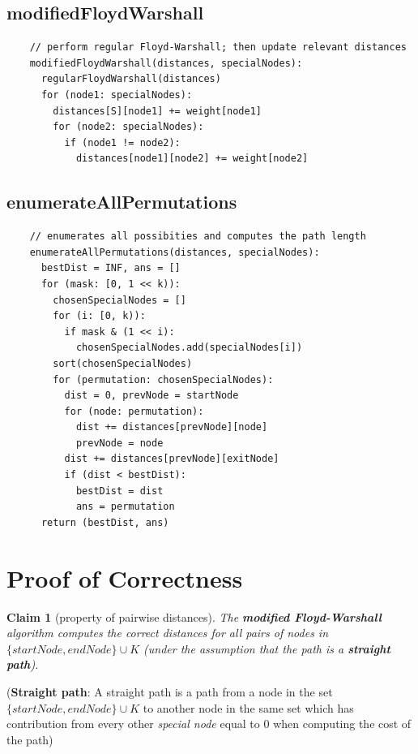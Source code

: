 \documentclass[12pt]{report}
\newtheorem{claim}[theorem]{Claim}
\begin{document}
\subsection{modifiedFloydWarshall}
\begin{tcolorbox}
\begin{verbatim}
    // perform regular Floyd-Warshall; then update relevant distances
    modifiedFloydWarshall(distances, specialNodes):
      regularFloydWarshall(distances)
      for (node1: specialNodes):
        distances[S][node1] += weight[node1]
        for (node2: specialNodes):
          if (node1 != node2):
            distances[node1][node2] += weight[node2]
\end{verbatim}
\end{tcolorbox}

\subsection{enumerateAllPermutations}
\label{pseudo:perms}
\begin{tcolorbox}
\begin{verbatim}
    // enumerates all possibities and computes the path length
    enumerateAllPermutations(distances, specialNodes):
      bestDist = INF, ans = []
      for (mask: [0, 1 << k)):
        chosenSpecialNodes = []
        for (i: [0, k)):
          if mask & (1 << i):
            chosenSpecialNodes.add(specialNodes[i])
        sort(chosenSpecialNodes)
        for (permutation: chosenSpecialNodes):
          dist = 0, prevNode = startNode
          for (node: permutation):
            dist += distances[prevNode][node]
            prevNode = node
          dist += distances[prevNode][exitNode]
          if (dist < bestDist):
            bestDist = dist
            ans = permutation
      return (bestDist, ans)
\end{verbatim}
\end{tcolorbox}

\section {Proof of Correctness}
\label{sec:brute-correctness}

\begin{claim}[property of pairwise distances]
\label{claim:dist-prop}
The \textbf{modified Floyd-Warshall} algorithm computes the correct distances for all pairs of nodes in $\{{startNode}, {endNode}\} \cup K$ (under the assumption that the path is a \textbf{straight path}).
\end{claim}
\noindent(\textbf{Straight path}: A straight path is a path from a node in the set $\{{startNode}, {endNode}\} \cup K$ to another node in the same set which has contribution from every other \textit{special node} equal to $0$ when computing the cost of the path)
\end{document}

